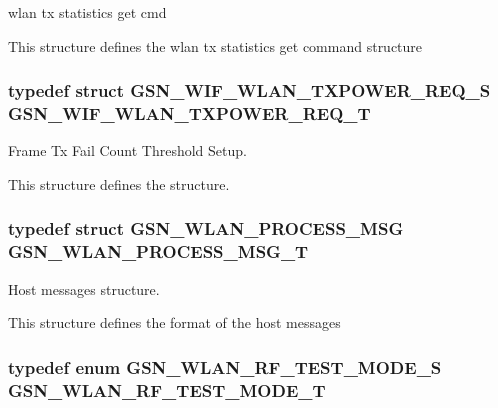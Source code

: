 wlan tx statistics get cmd 

This structure defines the wlan tx statistics get command structure \hypertarget{a00677_ga23625516479d19d7b54f0771fdacec4a}{
\subsubsection[{GSN\_\-WIF\_\-WLAN\_\-TXPOWER\_\-REQ\_\-T}]{\setlength{\rightskip}{0pt plus 5cm}typedef struct {\bf GSN\_\-WIF\_\-WLAN\_\-TXPOWER\_\-REQ\_\-S}  {\bf GSN\_\-WIF\_\-WLAN\_\-TXPOWER\_\-REQ\_\-T}}}
\label{a00677_ga23625516479d19d7b54f0771fdacec4a}


Frame Tx Fail Count Threshold Setup. 

This structure defines the structure. \hypertarget{a00677_gaabf8bae549f7aca1d1a07fbc8f2d4459}{
\subsubsection[{GSN\_\-WLAN\_\-PROCESS\_\-MSG\_\-T}]{\setlength{\rightskip}{0pt plus 5cm}typedef struct {\bf GSN\_\-WLAN\_\-PROCESS\_\-MSG} {\bf GSN\_\-WLAN\_\-PROCESS\_\-MSG\_\-T}}}
\label{a00677_gaabf8bae549f7aca1d1a07fbc8f2d4459}


Host messages structure. 

This structure defines the format of the host messages \hypertarget{a00677_ga05896005da162a0b0f4b304f7c551947}{
\subsubsection[{GSN\_\-WLAN\_\-RF\_\-TEST\_\-MODE\_\-T}]{\setlength{\rightskip}{0pt plus 5cm}typedef enum {\bf GSN\_\-WLAN\_\-RF\_\-TEST\_\-MODE\_\-S} {\bf GSN\_\-WLAN\_\-RF\_\-TEST\_\-MODE\_\-T}}}
\label{a00677_ga05896005da162a0b0f4b304f7c551947}


